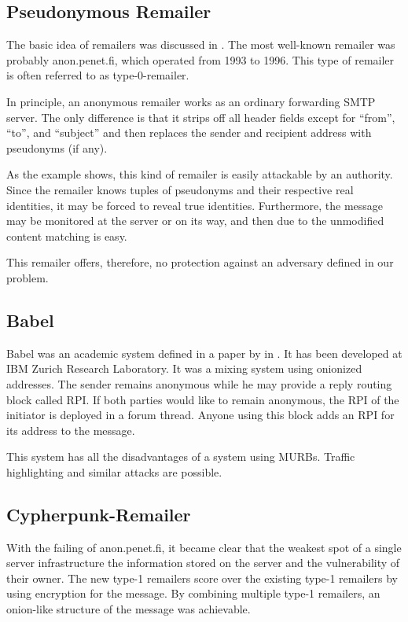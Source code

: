 \subsection{Pseudonymous Remailer\label{sec:remPseudo}}
The basic idea of remailers was discussed in \cite{CHAUM1}. The most well-known remailer was probably anon.penet.fi, which operated from 1993 to 1996. This type of remailer is often referred to as type-0-remailer.

In principle, an anonymous remailer works as an ordinary forwarding SMTP server. The only difference is that it strips off all header fields except for ``from'', ``to'', and ``subject'' and then replaces the sender and recipient address with pseudonyms (if any). 

As the example shows, this kind of remailer is easily attackable by an authority. Since the remailer knows tuples of pseudonyms and their respective real identities, it may be forced to reveal true identities. Furthermore, the message may be monitored at the server or on its way, and then due to the unmodified content matching is easy.

This remailer offers, therefore, no protection against an adversary defined in our problem.

\subsection{Babel}
Babel was an academic system defined in a paper by \citeauthor{babel} in \citeyear{babel}\cite{babel}. It has been developed at IBM Zurich Research Laboratory. It was a mixing system using onionized addresses. The sender remains anonymous while he may provide a reply routing block called RPI. If both parties would like to remain anonymous, the RPI of the initiator is deployed in a forum thread. Anyone using this block adds an RPI for its address to the message.

This system has all the disadvantages of a system using MURBs. Traffic highlighting and similar attacks are possible.

\subsection{Cypherpunk-Remailer\label{sec:remCypherpunk}}
With the failing of anon.penet.fi, it became clear that the weakest spot of a single server infrastructure the information stored on the server and the vulnerability of their owner. The new type-1 remailers score over the existing type-1 remailers by using encryption for the message. By combining multiple type-1 remailers, an onion-like structure of the message was achievable. 


